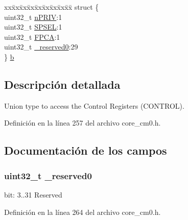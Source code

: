 \begin{DoxyCompactItemize}
\begin{tabbing}
\end{tabbing}\item 
\begin{tabbing}
xx\=xx\=xx\=xx\=xx\=xx\=xx\=xx\=xx\=\kill
struct \{\\
\>uint32\_t \hyperlink{union_c_o_n_t_r_o_l___type_a2a6e513e8a6bf4e58db169e312172332}{nPRIV}:1\\
\>uint32\_t \hyperlink{union_c_o_n_t_r_o_l___type_ae185aac93686ffc78e998a9daf41415b}{SPSEL}:1\\
\>uint32\_t \hyperlink{union_c_o_n_t_r_o_l___type_a2518558c090f60161ba4e718a54ee468}{FPCA}:1\\
\>uint32\_t \hyperlink{union_c_o_n_t_r_o_l___type_ac8a6a13838a897c8d0b8bc991bbaf7c1}{\_reserved0}:29\\
\} \hyperlink{union_c_o_n_t_r_o_l___type_abc5bd834a4b1a50b31cfe1a8113f9f68}{b}\\

\end{tabbing}\end{DoxyCompactItemize}


\subsection{Descripción detallada}
Union type to access the Control Registers (C\+O\+N\+T\+R\+OL). 

Definición en la línea 257 del archivo core\+\_\+cm0.\+h.



\subsection{Documentación de los campos}
\subsubsection[{\texorpdfstring{\+\_\+reserved0}{_reserved0}}]{\setlength{\rightskip}{0pt plus 5cm}uint32\+\_\+t \+\_\+reserved0}\hypertarget{union_c_o_n_t_r_o_l___type_ac8a6a13838a897c8d0b8bc991bbaf7c1}{}\label{union_c_o_n_t_r_o_l___type_ac8a6a13838a897c8d0b8bc991bbaf7c1}
bit\+: 3..31 Reserved 

Definición en la línea 264 del archivo core\+\_\+cm0.\+h.

